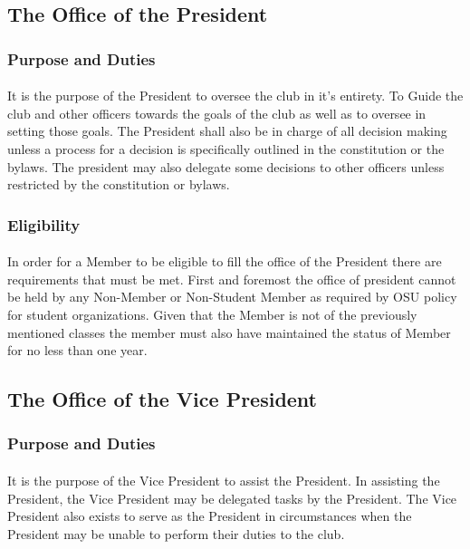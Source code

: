 \documentclass[12pt]{article}
\begin{document}
\subsection{The Office of the President}
\subsubsection{Purpose and Duties}
\paragraph{}
It is the purpose of the President to oversee the club in it's entirety. To Guide the club and other officers towards the goals of the club as well as to oversee in setting those goals. The President shall
also be in charge of all decision making unless a process for a decision is specifically outlined in the constitution or the bylaws. The president may also delegate some decisions to other officers unless
restricted by the constitution or bylaws.
\subsubsection{Eligibility}
\paragraph{}
In order for a Member to be eligible to fill the office of the President there are requirements that must be met. First and foremost the office of president cannot be held by any Non-Member or Non-Student Member as required by OSU policy for student organizations. Given that the Member is not of the previously mentioned classes the member must also have maintained the status of Member for no less than one year. 

\subsection{The Office of the Vice President}
\subsubsection{Purpose and Duties}
\paragraph{}
It is the purpose of the Vice President to assist the President. In assisting the President, the Vice President may be delegated tasks by the President. The Vice President also exists to serve as the 
President in circumstances when the President may be unable to perform their duties to the club.
\end{document}
